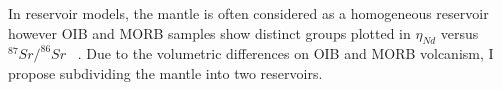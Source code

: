 In reservoir models, the mantle is often considered as a homogeneous reservoir however OIB and MORB samples show distinct groups plotted in $\eta_{Nd}$ versus $^{87}Sr/^{86}Sr$ ~\cite{WWM:2015}. Due to the volumetric differences on OIB and MORB volcanism, I propose subdividing the mantle into two reservoirs.